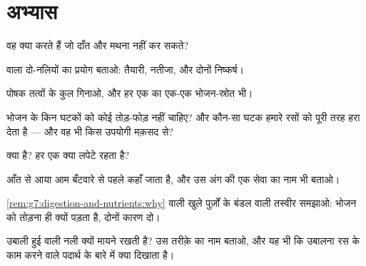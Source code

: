 \section{अभ्यास}

\begin{exercise}[$\star$]\label{exo:g7:digestion-and-nutrients:1}
 वह क्या करते हैं जो दाँत और मथना नहीं कर सकते?
\end{exercise}

\begin{exercise}[$\star$]\label{exo:g7:digestion-and-nutrients:2}
 वाला दो-नलियों का प्रयोग बताओ: तैयारी, नतीजा, और दोनों निष्कर्ष।
\end{exercise}

\begin{exercise}[$\star$]\label{exo:g7:digestion-and-nutrients:3}
पोषक तत्वों के कुल गिनाओ, और हर एक का एक-एक भोजन-स्रोत भी।
\end{exercise}

\begin{exercise}[$\star$]\label{exo:g7:digestion-and-nutrients:4}
भोजन के किन घटकों को कोई तोड़-फोड़ नहीं चाहिए? और कौन-सा घटक हमारे रसों
को पूरी तरह हरा देता है --- और वह भी किस उपयोगी मक़सद से?
\end{exercise}

\begin{exercise}[$\star$]\label{exo:g7:digestion-and-nutrients:5}
 क्या है? हर एक क्या लपेटे रहता है?
\end{exercise}

\begin{exercise}[$\star$]\label{exo:g7:digestion-and-nutrients:6}
आँत से आया  आम बँटवारे से पहले कहाँ जाता है, और उस अंग की एक सेवा
का नाम भी बताओ।
\end{exercise}

\begin{exercise}[$\star\star$]\label{exo:g7:digestion-and-nutrients:7}
\cref{rem:g7:digestion-and-nutrients:why} वाली खुले पुर्ज़ों के बंडल
वाली तस्वीर समझाओ: भोजन को तोड़ना ही क्यों पड़ता है, दोनों कारण दो।
\end{exercise}

\begin{exercise}[$\star\star$]\label{exo:g7:digestion-and-nutrients:8}
उबाली हुई  वाली नली क्यों मायने रखती है? उस तरीक़े का नाम बताओ, और
यह भी कि उबालना रस के काम करने वाले पदार्थ के बारे में क्या दिखाता है।
\end{exercise}

